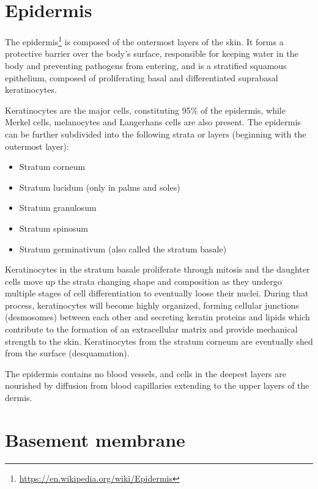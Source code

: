 \documentclass[]{book}
\providecommand{\tightlist}{%
  \setlength{\itemsep}{0pt}\setlength{\parskip}{0pt}}
\let\rmarkdownfootnote\footnote%
\def\footnote{\protect\rmarkdownfootnote}
\renewcommand{\href}[2]{#2\footnote{\url{#1}}}
\begin{document}
\hypertarget{epidermis}{%
\section{Epidermis}\label{epidermis}}

The \href{https://en.wikipedia.org/wiki/Epidermis}{epidermis} is composed of the outermost layers of the skin. It forms a protective barrier over the body's surface, responsible for keeping water in the body and preventing pathogens from entering, and is a stratified squamous epithelium, composed of proliferating basal and differentiated suprabasal keratinocytes.

Keratinocytes are the major cells, constituting 95\% of the epidermis, while Merkel cells, melanocytes and Langerhans cells are also present.
The epidermis can be further subdivided into the following strata or layers (beginning with the outermost layer):

\begin{itemize}
\tightlist
\item
  Stratum corneum
\item
  Stratum lucidum (only in palms and soles)
\item
  Stratum granulosum
\item
  Stratum spinosum
\item
  Stratum germinativum (also called the stratum basale)
\end{itemize}

Keratinocytes in the stratum basale proliferate through mitosis and the daughter cells move up the strata changing shape and composition as they undergo multiple stages of cell differentiation to eventually loose their nuclei. During that process, keratinocytes will become highly organized, forming cellular junctions (desmosomes) between each other and secreting keratin proteins and lipids which contribute to the formation of an extracellular matrix and provide mechanical strength to the skin. Keratinocytes from the stratum corneum are eventually shed from the surface (desquamation).

The epidermis contains no blood vessels, and cells in the deepest layers are nourished by diffusion from blood capillaries extending to the upper layers of the dermis.

\hypertarget{basement-membrane}{%
\section{Basement membrane}\label{basement-membrane}}
\end{document}
